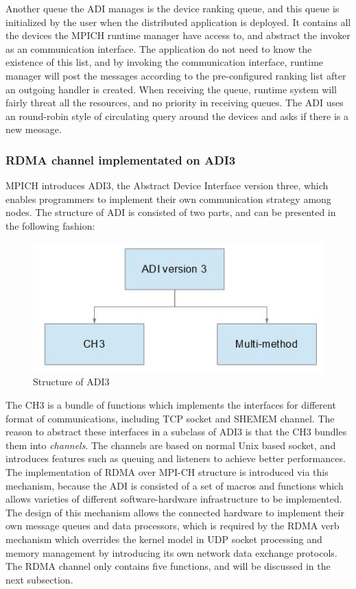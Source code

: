\documentclass[11pt,openright,a4paper]{report}
\begin{document}
Another queue the ADI manages is the device ranking queue, and this queue is initialized by the user when the distributed application is deployed. It contains all the devices the MPICH runtime manager have access to, and abstract the invoker as an communication interface. The application do not need to know the existence of this list, and by invoking the communication interface, runtime manager will post the messages according to the pre-configured ranking list after an outgoing handler is created. When receiving the queue, runtime system will fairly threat all the resources, and no priority in receiving queues. The ADI uses an round-robin style of circulating query around the devices and asks if there is a new message\cite{protopopov2001multithreaded}.\\

\subsubsection{RDMA channel implementated on ADI3}
MPICH introduces ADI3, the Abstract Device Interface version three, which enables programmers to implement their own communication strategy among nodes. The structure of ADI is consisted of two parts, and can be presented in the following fashion:
\begin{figure}[H]
\centering
\includegraphics[width=0.5\linewidth]{picture/ADI3}
\caption{Structure of ADI3}
\label{fig:ADI3}
\end{figure}
The CH3 is a bundle of functions which implements the interfaces for different format of communications, including TCP socket and SHEMEM channel. The reason to abstract these interfaces in a subclass of ADI3 is that the CH3 bundles them into \textit{channels}\cite{mpich_doc_adi3}. The channels are based on normal Unix based socket, and introduces features such as queuing and listeners to achieve better performances.\\
The implementation of RDMA over MPI-CH structure is introduced via this mechanism, because the ADI is consisted of a set of macros and functions which allows varieties of different software-hardware infrastructure to be implemented. The design of this mechanism allows the connected hardware to implement their own message queues and data processors, which is required by the RDMA verb mechanism which overrides the kernel model in UDP socket processing and memory management by introducing its own network data exchange protocols. The RDMA channel only contains five functions, and will be discussed in the next subsection.\\
\end{document}
